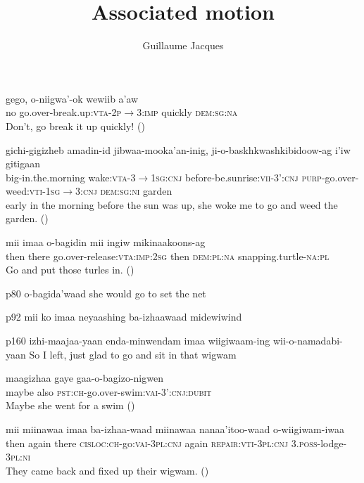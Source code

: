 \documentclass[oldfontcommands,oneside,a4paper,11pt]{article}
\begin{document}
 
 \title{Associated motion} 
\author{Guillaume Jacques}
\maketitle
\linenumbers
\sloppy


\citet{kegg93portage}

\begin{exe}
\ex 
\gll
gego, o-niigwa'-ok wewiib a'aw \\
no go.over-break.up:\textsc{vta}-\textsc{2p$\rightarrow$3:imp} quickly \textsc{dem:sg:na} \\
\glt Don't, go break it up quickly! (\citealt[150]{kegg93portage})
\end{exe}

\begin{exe}
\ex 
\gll
gichi-gigizheb amadin-id jibwaa-mooka'an-inig, ji-o-baskhkwashkibidoow-ag i'iw gitigaan \\
big-in.the.morning wake:\textsc{vta}-3$\rightarrow$\textsc{1sg}:\textsc{cnj} before-be.sunrise:\textsc{vii}-3':\textsc{cnj}
\textsc{purp}-go.over-weed:\textsc{vti}-\textsc{1sg}$\rightarrow$3:\textsc{cnj} \textsc{dem:sg:ni} garden \\
\glt early in the morning before the sun was up, she woke me to go and weed the garden. (\citealt[42]{kegg93portage})
\end{exe}

\begin{exe}
\ex 
\gll
mii imaa o-bagidin mii ingiw mikinaakoons-ag \\
then there go.over-release:\textsc{vta}:\textsc{imp:2sg} then \textsc{dem:pl:na} snapping.turtle-\textsc{na:pl} \\
\glt Go and put those turles in. (\citealt[51]{kegg93portage})
\end{exe}
p80 o-bagida'waad she would go to set the net

p92 mii ko imaa neyaashing ba-izhaawaad midewiwind

p160 
izhi-maajaa-yaan enda-minwendam imaa wiigiwaam-ing wii-o-namadabi-yaan
So I left, just glad to go and sit in that wigwam

\begin{exe}
\ex 
\gll
maagizhaa gaye gaa-o-bagizo-nigwen \\
maybe also \textsc{pst:ch}-go.over-swim:\textsc{vai}-\textsc{3':cnj:dubit} \\
\glt Maybe she went for a swim (\citealt[74]{kegg93portage})
\end{exe}
\begin{exe}
\ex 
\gll
mii miinawaa imaa ba-izhaa-waad miinawaa nanaa'itoo-waad o-wiigiwam-iwaa \\
then again there \textsc{cisloc:ch}-go:\textsc{vai}-\textsc{3pl:cnj} again \textsc{repair:vti}-\textsc{3pl:cnj} \textsc{3.poss}-lodge-\textsc{3pl:ni} \\
\glt They came back and fixed up their wigwam. (\citealt[32]{kegg93portage})
\end{exe}





 
\end{document}
